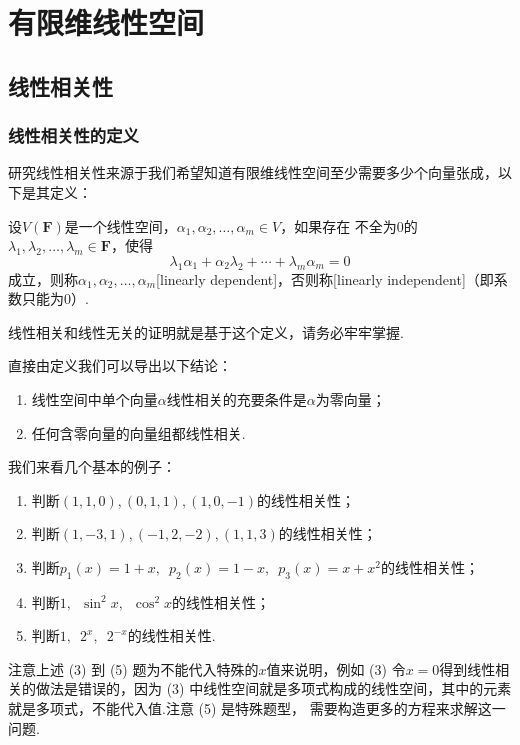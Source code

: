 \chapter{有限维线性空间}

\section{线性相关性}
\subsection{线性相关性的定义}
研究线性相关性来源于我们希望知道有限维线性空间至少需要多少个向量张成，以下是其定义：
\begin{definition}
    设$V(\mathbf{F})$是一个线性空间，$\alpha_1,\alpha_2,\ldots,\alpha_m\in V$，如果存在
    不全为$0$的$\lambda_1,\lambda_2,\ldots,\lambda_m\in\mathbf{F}$，使得
    \[\lambda_1\alpha_1+\alpha_2\lambda_2+\cdots+\lambda_m\alpha_m=0\]
    成立，则称$\alpha_1,\alpha_2,\ldots,\alpha_m$[linearly dependent]，否则称[linearly independent]（即系数只能为$0$）.
\end{definition}
线性相关和线性无关的证明就是基于这个定义，请务必牢牢掌握.

直接由定义我们可以导出以下结论：
\begin{enumerate}
    \item 线性空间中单个向量$\alpha$线性相关的充要条件是$\alpha$为零向量；

    \item 任何含零向量的向量组都线性相关.
\end{enumerate}

我们来看几个基本的例子：
\begin{example}
    \begin{enumerate}[label=(\arabic*)]
        \item 判断$(1,1,0),(0,1,1),(1,0,-1)$的线性相关性；

        \item 判断$(1,-3,1),(-1,2,-2),(1,1,3)$的线性相关性；

        \item 判断$p_1(x)=1+x,\enspace p_2(x)=1-x,\enspace p_3(x)=x+x^2$的线性相关性；

        \item 判断$1,\enspace \sin^2x,\enspace \cos^2x$的线性相关性；

        \item 判断$1,\enspace 2^x,\enspace 2^{-x}$的线性相关性.
    \end{enumerate}
\end{example}
注意上述 (3) 到 (5) 题为不能代入特殊的$x$值来说明，例如 (3) 令$x=0$得到线性相关的做法是错误的，因为
(3) 中线性空间就是多项式构成的线性空间，其中的元素就是多项式，不能代入值.注意 (5) 是特殊题型，
需要构造更多的方程来求解这一问题.

